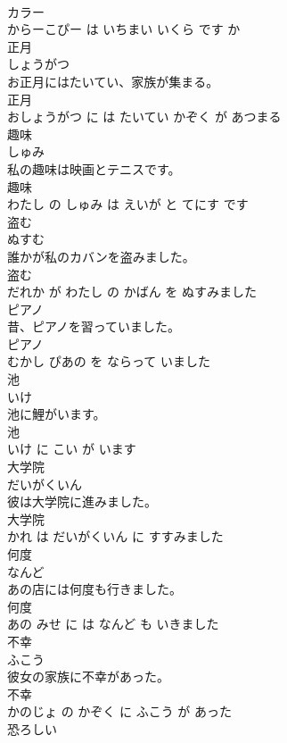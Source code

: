 \documentclass[8pt]{extreport}
\begin{document}
\begin{CJK}{UTF8}{min}
\\	カラー 
\\	からーこぴー は いちまい いくら です か			
\\	正月	
\\	しょうがつ			
\\	お正月にはたいてい、家族が集まる。	
\\	正月 
\\	おしょうがつ に は たいてい かぞく が あつまる			
\\	趣味	
\\	しゅみ			
\\	私の趣味は映画とテニスです。	
\\	趣味 
\\	わたし の しゅみ は えいが と てにす です			
\\	盗む	
\\	ぬすむ			
\\	誰かが私のカバンを盗みました。	
\\	盗む 
\\	だれか が わたし の かばん を ぬすみました			
\\	ピアノ	
\\	昔、ピアノを習っていました。	
\\	ピアノ 
\\	むかし ぴあの を ならって いました			
\\	池	
\\	いけ			
\\	池に鯉がいます。	
\\	池 
\\	いけ に こい が います			
\\	大学院	
\\	だいがくいん			
\\	彼は大学院に進みました。	
\\	大学院 
\\	かれ は だいがくいん に すすみました			
\\	何度	
\\	なんど			
\\	あの店には何度も行きました。	
\\	何度 
\\	あの みせ に は なんど も いきました			
\\	不幸	
\\	ふこう			
\\	彼女の家族に不幸があった。	
\\	不幸 
\\	かのじょ の かぞく に ふこう が あった			
\\	恐ろしい	

\end{CJK}
\end{document}
